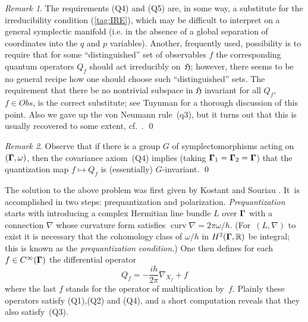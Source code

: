 \documentclass[11pt]{amsart}
\numberwithin{equation}{section}
\theoremstyle{remark}
\newtheorem{remark*}{Remark}
\newcommand\Obs{Obs}
\newcommand\Omg{{\bigam}}   %
\newcommand\HH{\mathfrak H}
\newcommand\RR{\mathbb R}
\newcommand{\bigam}{\mbox{\boldmath $\Gamma$}}
\begin{document}
\begin{remark*} The requirements (Q4) and (Q5) are, in some way, a substitute
for the irreducibility condition (\ref{tag:IRE}), which may be difficult to
interpret on a general symplectic manifold (i.e. in the absence of a global
separation of coordinates into the $q$ and $p$ variables). Another, frequently
used, possibility is to require that for some ``distinguished'' set of
observables $f$ the corresponding quantum operators $Q_f$ should act
irreducibly on~$\HH$; however, there seems to be no general recipe how one
should choose such ``distinguished'' sets. The requirement that there be no
nontrivial subspace in $\HH$ invariant for all $Q_f$, $f\in\Obs$, is
 the correct substitute; see Tuynman \cite{bib:TuyIrr} for a
thorough discussion of this point. Also we gave up the von Neumann rule~(q3),
but it turns out that this is usually recovered to some extent,
cf.~\cite{bib:GGTuy}.   \qed  \end{remark*}

\begin{remark*} Observe that if there is a group $G$ of symplectomorphisms
acting on $(\Omg,\omega)$, then the covariance axiom~(Q4) implies (taking
$\Omg_1=\Omg_2=\Omg$) that the quantization map $f\mapsto Q_f$ is (essentially)
$G$-invariant.  \qed  \end{remark*}

\medskip

The solution to the above problem was first given by Kostant \cite{bib:Kost}
and Souriau \cite{bib:SouSD}. It~is accomplished in two steps: prequantization
and polarization. {\sl Prequantization\/} starts with introducing a complex
Hermitian line bundle $L$ over $\Omg$ with a connection $\nabla$ whose
curvature form satisfies $\operatorname{curv} \nabla=2\pi\omega/h$.
(For~$(L,\nabla)$ to exist it is necessary that the cohomology class of
$\omega/h$ in $H^2(\Omg,\RR)$ be integral; this is known as the
{\sl prequantization condition.\/}) One then defines for each
$f\in C^\infty(\Omg)$ the differential operator
\begin{equation}  Q_f = -\frac{ih}{2\pi} \nabla_{X_f} + f  \label{tag:GQF}
\end{equation}
where the last $f$ stands for the operator of multiplication by~$f$. Plainly
these operators satisfy (Q1),(Q2) and (Q4), and a short computation reveals
that they also satisfy~(Q3).
\end{document}
